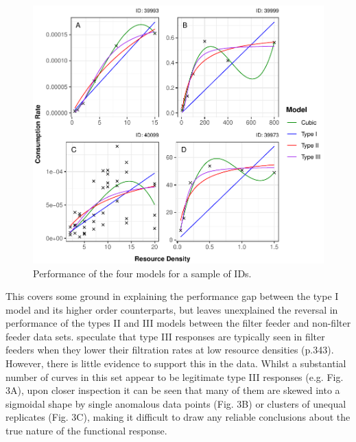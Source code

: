 \documentclass[11pt]{article}
\begin{document}
    
    \begin{figure}[t!]
	    \centering\includegraphics[width=1\textwidth]{TypeIIIFilts.pdf}
	    \caption{Performance of the four models for a sample of IDs.}
    \end{figure}
    
    This covers some ground in explaining the performance gap between the type I model and its higher order counterparts, but leaves unexplained the reversal in performance of the types II and III models between the filter feeder and non-filter feeder data sets. \citet{jeschke2004consumer} speculate that type III responses are typically seen in filter feeders when they lower their filtration rates at low resource densities (p.343). However, there is little evidence to support this in the data. Whilst a substantial number of curves in this set appear to be legitimate type III responses (e.g. Fig. 3A), upon closer inspection it can be seen that many of them are skewed into a sigmoidal shape by single anomalous data points (Fig. 3B) or clusters of unequal replicates (Fig. 3C), making it difficult to draw any reliable conclusions about the true nature of the functional response.
    
\end{document}
